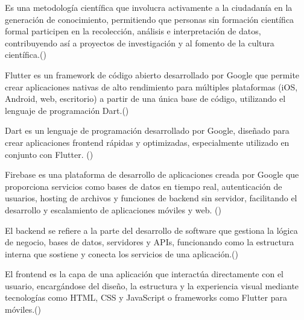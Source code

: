 \begin{definition}
Es una metodología científica que involucra activamente a la ciudadanía en la generación de conocimiento, permitiendo que personas sin formación científica formal participen en la recolección, análisis e interpretación de datos, contribuyendo así a proyectos de investigación y al fomento de la cultura científica.(\cite{csic_ciencia_ciudadana})
\end{definition}


\begin{definition}[Flutter]
Flutter es un framework de código abierto desarrollado por Google que permite crear aplicaciones nativas de alto rendimiento para múltiples plataformas (iOS, Android, web, escritorio) a partir de una única base de código, utilizando el lenguaje de programación Dart.(\cite{flutter_multiplataforma})
\end{definition}

\begin{definition}[Dart]

Dart es un lenguaje de programación desarrollado por Google, diseñado para crear aplicaciones frontend rápidas y optimizadas, especialmente utilizado en conjunto con Flutter. (\cite{dart})
\end{definition}
\begin{definition}[Firebase]

Firebase es una plataforma de desarrollo de aplicaciones creada por Google que proporciona servicios como bases de datos en tiempo real, autenticación de usuarios, hosting de archivos y funciones de backend sin servidor, facilitando el desarrollo y escalamiento de aplicaciones móviles y web. (\cite{firebase})
\end{definition}


\begin{definition}[Backend]
El backend se refiere a la parte del desarrollo de software que gestiona la lógica de negocio, bases de datos, servidores y APIs, funcionando como la estructura interna que sostiene y conecta los servicios de una aplicación.(\cite{backend})
\end{definition}



\begin{definition}[Frontend]
  El frontend es la capa de una aplicación que interactúa directamente con el usuario, encargándose del diseño, la estructura y la experiencia visual mediante tecnologías como HTML, CSS y JavaScript o frameworks como Flutter para móviles.(\cite{frontend})
\end{definition}




